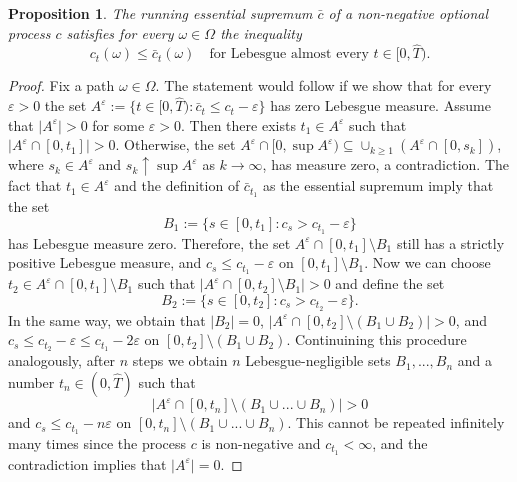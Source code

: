 \documentclass[11pt, oneside]{article}   	%
\theoremstyle{plain}
\newtheorem{prop}[thm]{Proposition}
\theoremstyle{definition}
\theoremstyle{remark}
\begin{document}
\begin{prop}\label{prop:increasing-dom}
The running essential supremum $\bar{c}$ of a non-negative optional process $c$ satisfies for every $\omega\in\Omega$ the inequality
$$c_t(\omega)\leq\bar{c}_t(\omega)\quad \text{for Lebesgue almost every } t\in[0,\hat{T}).$$
\end{prop}
\begin{proof}
Fix a path $\omega\in\Omega$. The statement would follow if we show that for every $\varepsilon>0$ the set $A^\varepsilon:=\{t\in[0,\hat{T}):\bar{c}_t\leq c_t-\varepsilon\}$ has zero Lebesgue measure. Assume that $\vert A^\varepsilon\vert>0$ for some $\varepsilon>0$. Then there exists $t_1\in A^\varepsilon$ such that $\vert A^\varepsilon\cap [0,t_1]\vert>0$. Otherwise, the set $A^\varepsilon\cap [0,\sup A^\varepsilon)\subseteq\cup_{k\geq 1}(A^\varepsilon\cap [0,s_k])$, where $s_k\in A^\varepsilon$ and $s_k\uparrow\sup A^\varepsilon$ as $k\to\infty$, has measure zero, a contradiction. The fact that $t_1\in A^\varepsilon$ and the definition of $\bar{c}_{t_1}$ as the essential supremum imply that the set
$$B_1:=\{s\in[0,t_1]: c_s>c_{t_1}-\varepsilon\}$$
has Lebesgue measure zero. Therefore, the set $A^\varepsilon\cap [0,t_1]\setminus B_1$ still has a strictly positive Lebesgue measure, and $c_s\leq c_{t_1}-\varepsilon$ on $[0,t_1]\setminus B_1$. Now we can choose $t_2\in A^\varepsilon\cap [0,t_1]\setminus B_1$ such that $\vert A^\varepsilon\cap [0,t_2]\setminus B_1\vert>0$ and define the set
$$B_2:=\{s\in[0,t_2]: c_s>c_{t_2}-\varepsilon\}.$$
In the same way, we obtain that $\vert B_2\vert=0$, $\vert A^\varepsilon\cap [0,t_2]\setminus (B_1\cup B_2)\vert>0$, and $c_s\leq c_{t_2}-\varepsilon\leq c_{t_1}-2\varepsilon$ on $[0,t_2]\setminus (B_1\cup B_2)$. Continuining this procedure analogously, after $n$ steps we obtain $n$ Lebesgue-negligible sets $B_1,...,B_n$ and a number $t_n\in(0,\hat{T})$ such that $$\vert A^\varepsilon\cap [0,t_n]\setminus (B_1\cup ...\cup B_n)\vert>0$$ and $c_s\leq c_{t_1}-n\varepsilon$ on $[0,t_n]\setminus (B_1\cup...\cup B_n)$. This cannot be repeated infinitely many times since the process $c$ is non-negative and $c_{t_1}<\infty$, and the contradiction implies that $\vert A^\varepsilon\vert=0$.
\end{proof}
\end{document}
